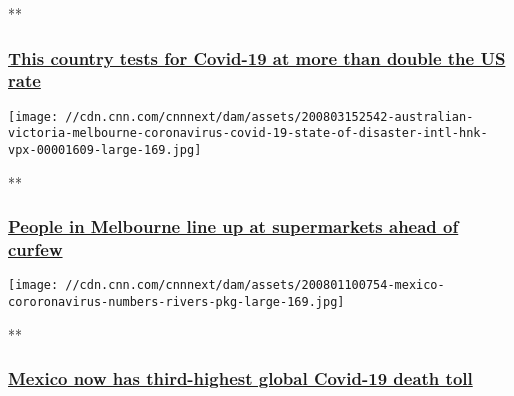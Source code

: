 **

\hypertarget{this-country-tests-for-covid-19-at-more-than-double-the-us-rate}{%
\subsubsection{\texorpdfstring{\href{/videos/world/2020/08/03/uae-abu-dhabi-coronavirus-covid-19-mass-testing-campaign-anderson-pkg-intl-ldn-vpx.cnn/video/playlists/coronavirus-intl/}{This
country tests for Covid-19 at more than double the US
rate}}{This country tests for Covid-19 at more than double the US rate}}\label{this-country-tests-for-covid-19-at-more-than-double-the-us-rate}}

\href{/videos/world/2020/08/03/australian-victoria-melbourne-coronavirus-covid-19-state-of-disaster-intl-hnk-vpx.cnn/video/playlists/coronavirus-intl/}{}

\texttt{[image: //cdn.cnn.com/cnnnext/dam/assets/200803152542-australian-victoria-melbourne-coronavirus-covid-19-state-of-disaster-intl-hnk-vpx-00001609-large-169.jpg]}

**

\hypertarget{people-in-melbourne-line-up-at-supermarkets-ahead-of-curfew}{%
\subsubsection{\texorpdfstring{\href{/videos/world/2020/08/03/australian-victoria-melbourne-coronavirus-covid-19-state-of-disaster-intl-hnk-vpx.cnn/video/playlists/coronavirus-intl/}{People
in Melbourne line up at supermarkets ahead of
curfew}}{People in Melbourne line up at supermarkets ahead of curfew}}\label{people-in-melbourne-line-up-at-supermarkets-ahead-of-curfew}}

\href{/videos/world/2020/08/01/mexico-coronavirus-death-toll-rivers-pkg-vpx.cnn/video/playlists/coronavirus-intl/}{}

\texttt{[image: //cdn.cnn.com/cnnnext/dam/assets/200801100754-mexico-cororonavirus-numbers-rivers-pkg-large-169.jpg]}

**

\hypertarget{mexico-now-has-third-highest-global-covid-19-death-toll}{%
\subsubsection{\texorpdfstring{\href{/videos/world/2020/08/01/mexico-coronavirus-death-toll-rivers-pkg-vpx.cnn/video/playlists/coronavirus-intl/}{Mexico
now has third-highest global Covid-19 death
toll}}{Mexico now has third-highest global Covid-19 death toll}}\label{mexico-now-has-third-highest-global-covid-19-death-toll}}

